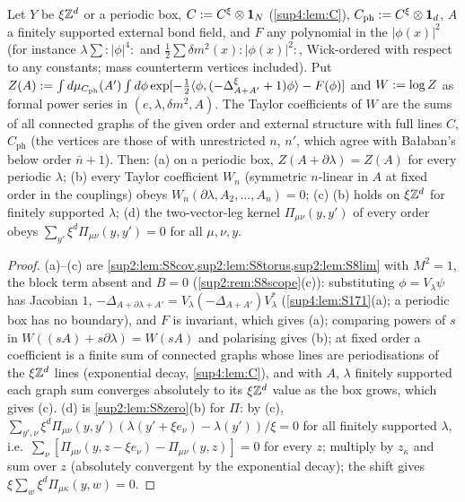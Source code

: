 \begin{lemma}\label{sup4:lem:S216}
Let $Y$ be $\xi\mathbb Z^d$ or a periodic box, $C:= C^\xi\otimes\mathbf 1_N$ (\cref{sup4:lem:C}), $C_{\mathrm{ph}}:= C^\xi\otimes\mathbf 1_d$, $A$ a finitely supported external bond field, and $F$ any polynomial in the $|\phi(x)|^2$ (for instance $\lambda\sum:\!|\phi|^4\!:$ and $\frac12\sum\delta m^2(x):\!|\phi(x)|^2\!:$, Wick-ordered with respect to any constants; mass counterterm vertices included). Put $Z(A):=\int d\mu_{C_{\mathrm{ph}}}(A')\int d\phi\exp[-\frac12\langle \phi,(-\Delta^\xi_{A+A'}+1)\phi\rangle-F(\phi)]$ and $W:=\log Z$ as formal power series in $(e,\lambda,\delta m^2,A)$. The Taylor coefficients of $W$ are the sums of all connected graphs of the given order and external structure with full lines $C$, $C_{\mathrm{ph}}$ (the vertices are those of \cite[(1.8)--(1.11)]{Ba3} with unrestricted $n$, $n'$, which agree with Ba{\l}aban's below order $\bar n+1$). Then: \textup{(a)} on a periodic box, $Z(A+\partial\lambda)=Z(A)$ for every periodic $\lambda$; \textup{(b)} every Taylor coefficient $W_n$ (symmetric $n$-linear in $A$ at fixed order in the couplings) obeys $W_n(\partial\lambda,A_2,\dots,A_n)=0$; \textup{(c)} (b) holds on $\xi\mathbb Z^d$ for finitely supported $\lambda$; \textup{(d)} the two-vector-leg kernel $\Pi_{\mu\nu}(y,y')$ of every order obeys $\sum_{y'}\xi^d\Pi_{\mu\nu}(y,y')=0$ for all $\mu,\nu,y$.
\end{lemma}

\begin{proof}
(a)--(c) are \cref{sup2:lem:S8cov,sup2:lem:S8torus,sup2:lem:S8lim} with $M^2=1$, the block term absent and $B=0$ (\cref{sup2:rem:S8scope}(c)): substituting $\phi=V_\lambda\psi$ has Jacobian $1$, $-\Delta_{A+\partial\lambda+A'}=V_\lambda(-\Delta_{A+A'})V_\lambda^*$ (\cref{sup4:lem:S171}(a); a periodic box has no boundary), and $F$ is invariant, which gives (a); comparing powers of $s$ in $W((sA)+s\partial\lambda)=W(sA)$ and polarising gives (b); at fixed order a coefficient is a finite sum of connected graphs whose lines are periodisations of the $\xi\mathbb Z^d$ lines (exponential decay, \cref{sup4:lem:C}), and with $A$, $\lambda$ finitely supported each graph sum converges absolutely to its $\xi\mathbb Z^d$ value as the box grows, which gives (c). (d) is \cref{sup2:lem:S8zero}(b) for $\Pi$: by (c), $\sum_{y',\nu}\xi^d\Pi_{\mu\nu}(y,y')(\lambda(y'+\xi e_\nu)-\lambda(y'))/\xi=0$ for all finitely supported $\lambda$, i.e.\ $\sum_\nu[\Pi_{\mu\nu}(y,z-\xi e_\nu)-\Pi_{\mu\nu}(y,z)]=0$ for every $z$; multiply by $z_\kappa$ and sum over $z$ (absolutely convergent by the exponential decay); the shift gives $\xi\sum_w\xi^d\Pi_{\mu\kappa}(y,w)=0$.
\end{proof}

